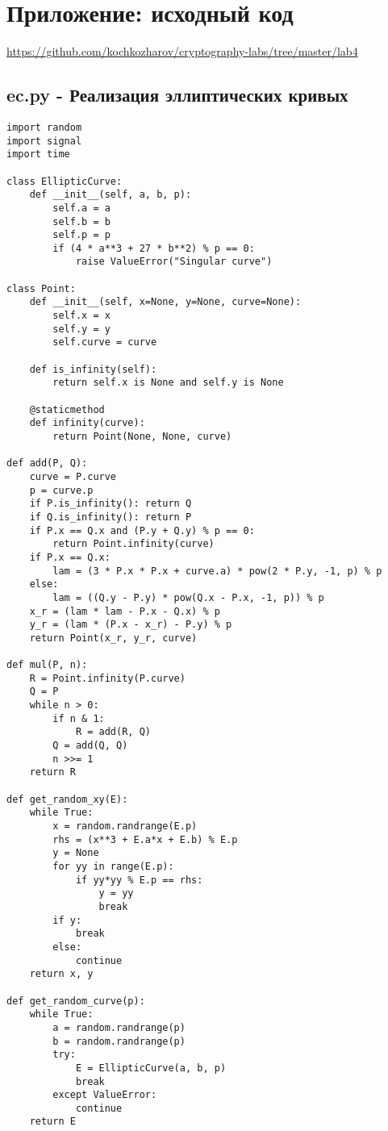\documentclass[a4paper,12pt]{article}
\begin{document}
\section{Приложение: исходный код}
\href{https://github.com/kochkozharov/cryptography-labs/tree/master/lab4}{https://github.com/kochkozharov/cryptography-labs/tree/master/lab4} 


\subsection{ec.py - Реализация эллиптических кривых}
\begin{lstlisting}
import random
import signal
import time

class EllipticCurve:
    def __init__(self, a, b, p):
        self.a = a
        self.b = b
        self.p = p
        if (4 * a**3 + 27 * b**2) % p == 0:
            raise ValueError("Singular curve")

class Point:
    def __init__(self, x=None, y=None, curve=None):
        self.x = x
        self.y = y
        self.curve = curve

    def is_infinity(self):
        return self.x is None and self.y is None

    @staticmethod
    def infinity(curve):
        return Point(None, None, curve)

def add(P, Q):
    curve = P.curve
    p = curve.p
    if P.is_infinity(): return Q
    if Q.is_infinity(): return P
    if P.x == Q.x and (P.y + Q.y) % p == 0:
        return Point.infinity(curve)
    if P.x == Q.x:
        lam = (3 * P.x * P.x + curve.a) * pow(2 * P.y, -1, p) % p
    else:
        lam = ((Q.y - P.y) * pow(Q.x - P.x, -1, p)) % p
    x_r = (lam * lam - P.x - Q.x) % p
    y_r = (lam * (P.x - x_r) - P.y) % p
    return Point(x_r, y_r, curve)

def mul(P, n):
    R = Point.infinity(P.curve)
    Q = P
    while n > 0:
        if n & 1:
            R = add(R, Q)
        Q = add(Q, Q)
        n >>= 1
    return R

def get_random_xy(E):
    while True:
        x = random.randrange(E.p)
        rhs = (x**3 + E.a*x + E.b) % E.p
        y = None
        for yy in range(E.p):
            if yy*yy % E.p == rhs:
                y = yy
                break
        if y:
            break
        else:
            continue
    return x, y

def get_random_curve(p):
    while True:
        a = random.randrange(p)
        b = random.randrange(p)
        try:
            E = EllipticCurve(a, b, p)
            break
        except ValueError:
            continue
    return E


\end{lstlisting}
\end{document}
